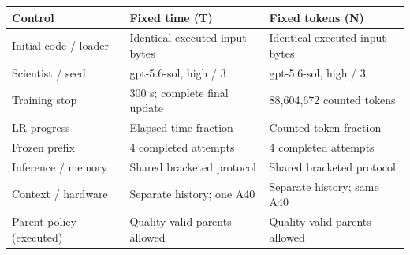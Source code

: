 \begin{tabular}{p{1.2in}p{1.8in}p{1.8in}}
\toprule
Control & Fixed time (T) & Fixed tokens (N) \\
\midrule
Initial code / loader & Identical executed input bytes & Identical executed input bytes \\
Scientist / seed & gpt-5.6-sol, high / 3 & gpt-5.6-sol, high / 3 \\
Training stop & 300 s; complete final update & 88,604,672 counted tokens \\
LR progress & Elapsed-time fraction & Counted-token fraction \\
Frozen prefix & 4 completed attempts & 4 completed attempts \\
Inference / memory & Shared bracketed protocol & Shared bracketed protocol \\
Context / hardware & Separate history; one A40 & Separate history; same A40 \\
Parent policy (executed) & Quality-valid parents allowed & Quality-valid parents allowed \\
\bottomrule
\end{tabular}
